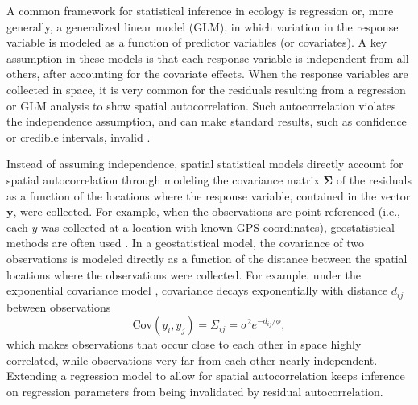 \documentclass[11pt, titlepage]{article}\usepackage[]{graphicx}\usepackage[]{color}
\begin{document}
\begin{spacing}{1.9}
\begin{flushleft}
A common framework for statistical inference in ecology is regression or, more generally, a generalized linear model (GLM), in which variation in the response variable is modeled as a function of predictor variables (or covariates).  A key assumption in these models is that each response variable is independent from all others, after accounting for the covariate effects.  When the response variables are collected in space, it is very common for the residuals resulting from a regression or GLM analysis to show spatial autocorrelation.  Such autocorrelation violates the independence assumption, and can make standard results, such as confidence or credible intervals, invalid \citep{Clif:Ord:spat:1981,Lege:spat:1993}. 

Instead of assuming independence, spatial statistical models directly account for spatial autocorrelation through modeling the covariance matrix $\boldsymbol\Sigma$ of the residuals as a function of the locations where the response variable, contained in the vector $\mathbf{y}$, were collected.  For example, when the observations are point-referenced (i.e., each $y$ was collected at a location with known GPS coordinates), geostatistical methods are often used \citep[e.g.,][]{Turn:ONei:Conl:Conl:Hump:patt:1991}.  In a geostatistical model, the covariance of two observations is modeled directly as a function of the distance between the spatial locations where the observations were collected.  For example, under the exponential covariance model \citep[][p. 84]{Chil:Delf:geos:1999}, covariance decays exponentially with distance $d_{ij}$ between observations
\begin{equation} \label{eq:expGeo}
  \text{Cov}(y_i,y_j)=\Sigma_{ij}=\sigma^2e^{-d_{ij}/\phi},
\end{equation}
which makes observations that occur close to each other in space highly correlated, while observations very far from each other nearly independent.  Extending a regression model to allow for spatial autocorrelation \citep[e.g.,][]{Ver:Cres:Fish:Case:unce:2001} keeps inference on regression parameters from being invalidated by residual autocorrelation.


\end{flushleft}
\end{spacing}
\end{document}
